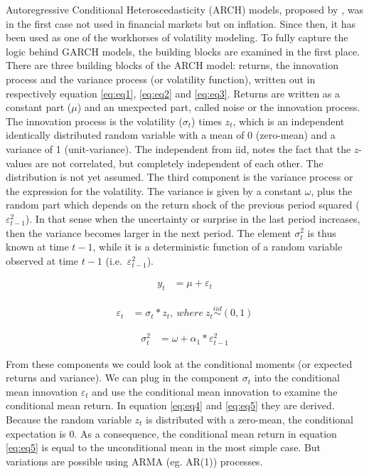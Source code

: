 \documentclass[a4paper, twoside]{templates/ociamthesis}
\begin{document}
Autoregressive Conditional Heteroscedasticity (ARCH) models, proposed by \textcite{engle1982}, was in the first case not used in financial markets but on inflation. Since then, it has been used as one of the workhorses of volatility modeling. To fully capture the logic behind GARCH models, the building blocks are examined in the first place. There are three building blocks of the ARCH model: returns, the innovation process and the variance process (or volatility function), written out in respectively equation \eqref{eq:eq1}, \eqref{eq:eq2} and \eqref{eq:eq3}. Returns are written as a constant part (\(\mu\)) and an unexpected part, called noise or the innovation process. The innovation process is the volatility (\(\sigma_t\)) times \(z_t\), which is an independent identically distributed random variable with a mean of 0 (zero-mean) and a variance of 1 (unit-variance). The independent from iid, notes the fact that the \(z\)-values are not correlated, but completely independent of each other. The distribution is not yet assumed. The third component is the variance process or the expression for the volatility. The variance is given by a constant \(\omega\), plus the random part which depends on the return shock of the previous period squared (\(\varepsilon_{t-1}^2\)). In that sense when the uncertainty or surprise in the last period increases, then the variance becomes larger in the next period. The element \(\sigma_t^2\) is thus known at time \(t-1\), while it is a deterministic function of a random variable observed at time \(t-1\) (i.e.~\(\varepsilon_{t-1}^2\)).

\begin{align} 
y_{t} &= \mu + \varepsilon_t
 \label{eq:eq1}
\end{align}

\begin{align} 
\varepsilon_{t} &= \sigma_t * z_t, \ where \ z_t \stackrel{iid}{\sim} (0,1)
 \label{eq:eq2}
\end{align} 

\begin{align} 
\sigma_{t}^{2} &= \omega + \alpha_1 *  \varepsilon_{t-1}^2 
 \label{eq:eq3}
\end{align}

From these components we could look at the conditional moments (or expected returns and variance). We can plug in the component \(\sigma_t\) into the conditional mean innovation \(\varepsilon_{t}\) and use the conditional mean innovation to examine the conditional mean return. In equation \eqref{eq:eq4} and \eqref{eq:eq5} they are derived. Because the random variable \(z_t\) is distributed with a zero-mean, the conditional expectation is 0. As a consequence, the conditional mean return in equation \eqref{eq:eq5} is equal to the unconditional mean in the most simple case. But variations are possible using ARMA (eg. AR(1)) processes.
\end{document}
